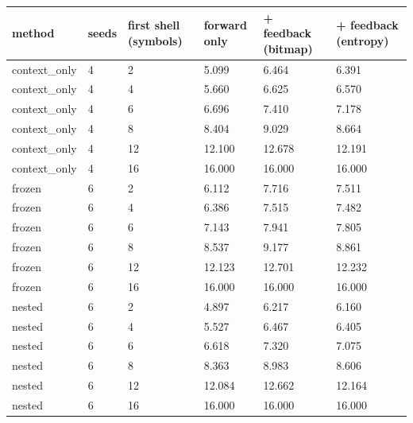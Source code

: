 \begin{tabular}{llllll}
\hline
method & seeds & first shell (symbols) & forward only & + feedback (bitmap) & + feedback (entropy) \\
\hline
context\_only & 4 & 2 & 5.099 & 6.464 & 6.391 \\
context\_only & 4 & 4 & 5.660 & 6.625 & 6.570 \\
context\_only & 4 & 6 & 6.696 & 7.410 & 7.178 \\
context\_only & 4 & 8 & 8.404 & 9.029 & 8.664 \\
context\_only & 4 & 12 & 12.100 & 12.678 & 12.191 \\
context\_only & 4 & 16 & 16.000 & 16.000 & 16.000 \\
frozen & 6 & 2 & 6.112 & 7.716 & 7.511 \\
frozen & 6 & 4 & 6.386 & 7.515 & 7.482 \\
frozen & 6 & 6 & 7.143 & 7.941 & 7.805 \\
frozen & 6 & 8 & 8.537 & 9.177 & 8.861 \\
frozen & 6 & 12 & 12.123 & 12.701 & 12.232 \\
frozen & 6 & 16 & 16.000 & 16.000 & 16.000 \\
nested & 6 & 2 & 4.897 & 6.217 & 6.160 \\
nested & 6 & 4 & 5.527 & 6.467 & 6.405 \\
nested & 6 & 6 & 6.618 & 7.320 & 7.075 \\
nested & 6 & 8 & 8.363 & 8.983 & 8.606 \\
nested & 6 & 12 & 12.084 & 12.662 & 12.164 \\
nested & 6 & 16 & 16.000 & 16.000 & 16.000 \\
\hline
\end{tabular}
